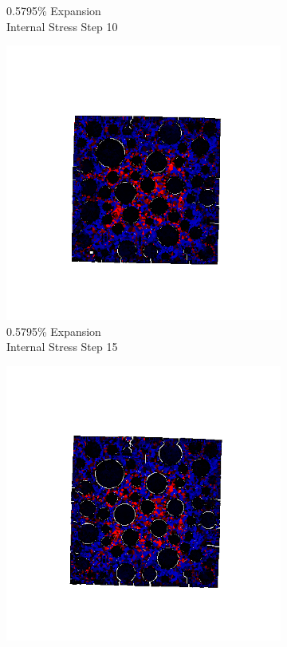 \begin{figure}[ht!]
\begin{subfigure}{.25\textwidth}
      \caption{0.5795\% Expansion\\Internal Stress Step 10}
    \end{subfigure}%
    \begin{subfigure}{.25\textwidth}
      \centering
      \includegraphics[width=1.0\linewidth]{Files/exp_3D/DEF/A30X0C_3_s15.png}
      \caption{0.5795\% Expansion\\Internal Stress Step 15}
    \end{subfigure}%
    \begin{subfigure}{.25\textwidth}
      \centering
      \includegraphics[width=1.0\linewidth]{Files/exp_3D/DEF/A30X0C_3_stress.png}

\end{subfigure}
\end{figure}
